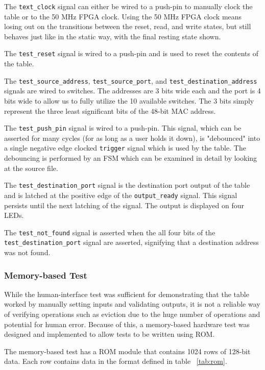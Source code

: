 \documentclass{article}
\begin{document}
The \texttt{text\_clock} signal can either be wired to a push-pin to manually clock the table or to the 50 MHz FPGA clock. Using the 50 MHz FPGA clock means losing out on the transitions between the reset, read, and write states, but still behaves just like in the static way, with the final resting state shown. 

The \texttt{test\_reset} signal is wired to a push-pin and is used to reset the contents of the table.

The \texttt{test\_source\_address}, \texttt{test\_source\_port}, and \texttt{test\_destination\_address} signals are wired to switches. The addresses are 3 bits wide each and the port is 4 bits wide to allow us to fully utilize the 10 available switches. The 3 bits simply represent the three least significant bits of the 48-bit MAC address.

The \texttt{test\_push\_pin} signal is wired to a push-pin. This signal, which can be asserted for many cycles (for as long as a user holds it down), is "debounced" into a single negative edge clocked \texttt{trigger} signal which is used by the table. The debouncing is performed by an FSM which can be examined in detail by looking at the source file.

The \texttt{test\_destination\_port} signal is the destination port output of the table and is latched at the positive edge of the \texttt{output\_ready} signal. This signal persists until the next latching of the signal. The output is displayed on four LEDs.

The \texttt{test\_not\_found} signal is asserted when the all four bits of the \texttt{test\_destination\_port} signal are asserted, signifying that a destination address was not found.

\subsubsection{Memory-based Test}

While the human-interface test was sufficient for demonstrating that the table worked by manually setting inputs and validating outputs, it is not a reliable way of verifying operations such as eviction due to the huge number of operations and potential for human error. Because of this, a memory-based hardware test was designed and implemented to allow tests to be written using ROM.

The memory-based test has a ROM module that contains 1024 rows of 128-bit data. Each row contains data in the format defined in table ~\ref{tab:rom}. 
\end{document}
